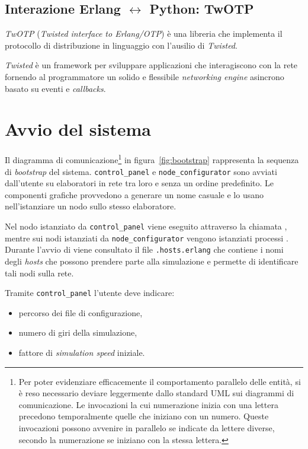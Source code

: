 \subsection*{Interazione Erlang $\leftrightarrow$ Python: TwOTP}
\textsl{TwOTP} (\textit{Twisted interface to Erlang/OTP}) è una libreria che implementa il protocollo di distribuzione \Erlang{} in linguaggio \Python{} con l'ausilio di \textsl{Twisted}.

\textsl{Twisted} è un framework per sviluppare applicazioni che interagiscono con la rete fornendo al programmatore un solido e flessibile \textit{networking engine} asincrono basato su eventi e \textit{callbacks}.

\section{Avvio del sistema}
\label{sec:avvio}

Il diagramma di comunicazione\footnote{Per poter evidenziare efficacemente il comportamento parallelo delle entità, si è reso necessario deviare leggermente dallo standard UML sui diagrammi di comunicazione. Le invocazioni la cui numerazione inizia con una lettera precedono temporalmente quelle che iniziano con un numero. Queste invocazioni possono avvenire in parallelo se indicate da lettere diverse, secondo la numerazione se iniziano con la stessa lettera.} in figura~\ref{fig:bootstrap} rappresenta la sequenza di \textit{bootstrap} del sistema. \texttt{control\_panel} e \texttt{node\_configurator} sono avviati dall'utente su elaboratori in rete tra loro e senza un ordine predefinito. Le componenti grafiche provvedono a generare un nome casuale e lo usano nell'istanziare un nodo \Erlang{} sullo stesso elaboratore.

Nel nodo \Erlang{} istanziato da \texttt{control\_panel} viene eseguito \bootserv{} attraverso la chiamata , mentre sui nodi istanziati da \texttt{node\_configurator} vengono istanziati processi \nodeman{}. Durante l'avvio di \nodeman{} viene consultato il file \texttt{.hosts.erlang} che contiene i nomi degli \textit{hosts} che possono prendere parte alla simulazione e permette di identificare tali nodi sulla rete.

Tramite \texttt{control\_panel} l'utente deve indicare:
\begin{itemize}
\item percorso dei file di configurazione,
\item numero di giri della simulazione,
\item fattore di \textit{simulation speed} iniziale.
\end{itemize}

